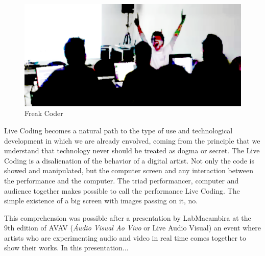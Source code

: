 \documentclass[letterpaper, 12pt]{article}
\begin{document}
\begin{figure}[htpb]
  \begin{center}
    \includegraphics[scale=.4]{img/fig_freakcoder.png}
    \caption{Freak Coder}
    \label{fig:freakcoder}
  \end{center}
\end{figure}

Live Coding becomes a natural path to the type of use and
technological development in which we are already envolved, coming
from the principle that we understand that technology never should be
treated as dogma or secret. The Live Coding is a disalienation of the
behavior of a digital artist. Not only the code is showed and
manipulated, but the computer screen and any interaction between the
performance and the computer. The triad performancer, computer and
audience together makes possible to call the performance Live
Coding. The simple existence of a big screen with images passing on
it, no.  

This comprehension was possible after a presentation by LabMacambira
at the 9th edition of AVAV (\textit{\'{A}udio Visual Ao Vivo} or Live
Audio Visual) an event where artists who are experimenting audio and
video in real time comes together to show their works. In this
presentation...

\end{document}
